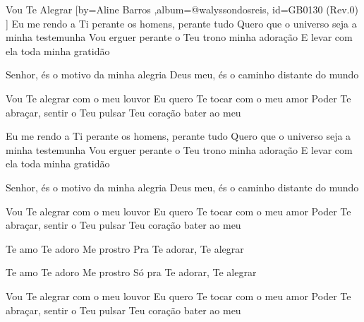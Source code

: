\beginsong
{Vou Te Alegrar %
}[by={Aline Barros %
},album={@walyssondosreis},
id={GB0130 %
(Rev.0) %
}]
Eu me rendo a Ti perante os homens, perante tudo
Quero que o universo seja a minha testemunha
Vou erguer perante o Teu trono minha adoração
E levar com ela toda minha gratidão

Senhor, és o motivo da minha alegria
Deus meu, és o caminho distante do mundo

Vou Te alegrar com o meu louvor
Eu quero Te tocar com o meu amor
Poder Te abraçar, sentir o Teu pulsar
Teu coração bater ao meu

Eu me rendo a Ti perante os homens, perante tudo
Quero que o universo seja a minha testemunha
Vou erguer perante o Teu trono minha adoração
E levar com ela toda minha gratidão

Senhor, és o motivo da minha alegria
Deus meu, és o caminho distante do mundo

Vou Te alegrar com o meu louvor
Eu quero Te tocar com o meu amor
Poder Te abraçar, sentir o Teu pulsar
Teu coração bater ao meu

Te amo
Te adoro
Me prostro
Pra Te adorar, Te alegrar

Te amo
Te adoro
Me prostro
Só pra Te adorar, Te alegrar

Vou Te alegrar com o meu louvor
Eu quero Te tocar com o meu amor
Poder Te abraçar, sentir o Teu pulsar
Teu coração bater ao meu



